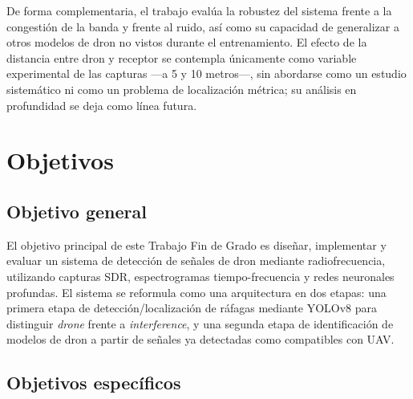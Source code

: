 De forma complementaria, el trabajo evalúa la robustez del sistema frente a la congestión de la banda y frente al ruido, así como su capacidad de generalizar a otros modelos de dron no vistos durante el entrenamiento. El efecto de la distancia entre dron y receptor se contempla únicamente como variable experimental de las capturas ---a 5 y 10 metros---, sin abordarse como un estudio sistemático ni como un problema de localización métrica; su análisis en profundidad se deja como línea futura.

\section{Objetivos}
\label{sec:objetivos}

\subsection{Objetivo general}

El objetivo principal de este Trabajo Fin de Grado es diseñar, implementar y evaluar un sistema de detección de señales de dron mediante radiofrecuencia, utilizando capturas SDR, espectrogramas tiempo-frecuencia y redes neuronales profundas. El sistema se reformula como una arquitectura en dos etapas: una primera etapa de detección/localización de ráfagas mediante YOLOv8 para distinguir \emph{drone} frente a \emph{interference}, y una segunda etapa de identificación de modelos de dron a partir de señales ya detectadas como compatibles con UAV.

\subsection{Objetivos específicos}


